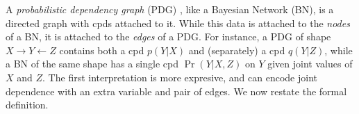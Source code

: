 \documentclass[twoside]{article}
\theoremstyle{plain}
\theoremstyle{definition}
\newcommand{\ed}[3]{#2%
	  \overset{\smash{\mskip-5mu\raisebox{-1pt}{$\scriptscriptstyle
	        #1$}}}{\rightarrow} #3}
\begin{document}
A \emph{probabilistic dependency graph} (PDG)
\parencite{richardson2020probabilistic}, like a Bayesian Network (BN), is a
directed graph with cpds attached to it. While this data is attached
to the \emph{nodes} of a BN, it is attached to the \emph{edges} of a PDG.
For instance, a PDG of shape
$
X \to Y \leftarrow Z
$
contains both a cpd $p(Y | X)$ and (separately) a cpd $q(Y | Z)$, while a BN of the same shape has a single cpd $\Pr(Y | X,Z)$ on $Y$ given joint values of $X$ and $Z$.
The first interpretation is more expresive, and can encode joint dependence with an extra variable and pair of edges.
We now restate the formal definition.
\end{document}
